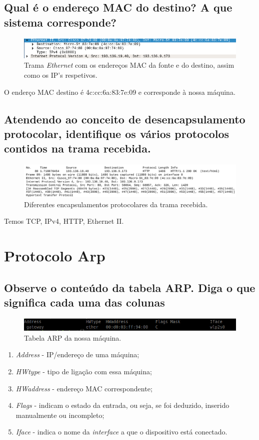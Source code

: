 \documentclass[a4paper]{article}
\begin{document}
\subsection{Qual	é	o	endereço	MAC	do	destino?	A	que	sistema	corresponde?}
\begin{figure}[H]
\centering
\includegraphics[scale=0.50]{pics/p6.png}
\caption{Trama \textit{Ethernet} com os endereços MAC da fonte e do destino, assim como os IP's respetivos.}
\end{figure}
O enderço MAC destino é 4c:cc:6a:83:7e:09 e corresponde à nossa máquina.


\subsection{Atendendo	ao	conceito	de	desencapsulamento	protocolar,	identifique	 os	 vários	
protocolos	contidos	na	trama	recebida.}
\begin{figure}[H]
\centering
\includegraphics[scale=0.30]{pics/p8.png}
\caption{Diferentes encapsulamentos protocolares da trama recebida.}
\end{figure}
Temos TCP, IPv4, HTTP, Ethernet II.

\section{Protocolo Arp}
\setcounter{subsection}{8}

\subsection{Observe o conteúdo da tabela ARP. Diga o que significa cada uma das colunas}
\begin{figure}[H]
\centering
\includegraphics[scale=0.50]{pics/p9.png}
\caption{Tabela ARP da nossa máquina.}
\end{figure}

\begin{enumerate}
    \item \textit{Address} - IP/endereço de uma máquina;
    \item \textit{HWtype} - tipo de ligação com essa máquina;
    \item \textit{HWaddress} - endereço MAC correspondente;
    \item \textit{Flags} - indicam o estado da entrada, ou seja, se foi deduzido, inserido manualmente ou incompleto;
    \item \textit{Iface} - indica o nome da \textit{interface} a que o dispositivo está conectado.
\end{enumerate}
\end{document}
